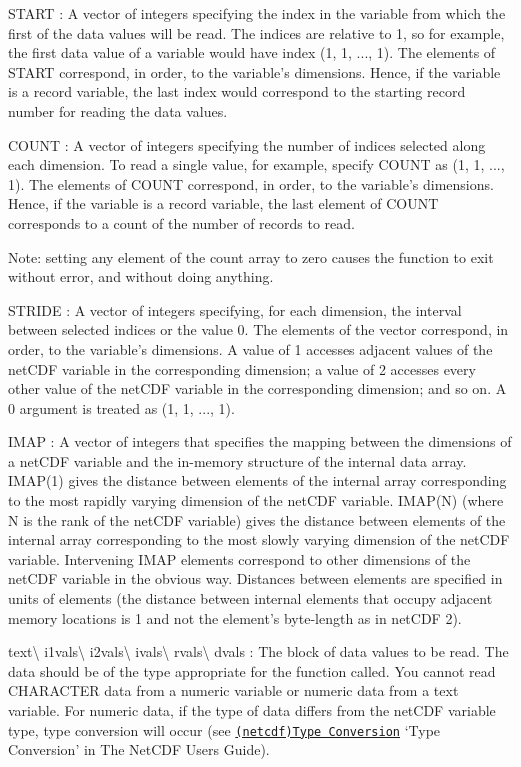 {\ttfamily S\+T\+A\+RT} \+: A vector of integers specifying the index in the variable from which the first of the data values will be read. The indices are relative to 1, so for example, the first data value of a variable would have index (1, 1, ..., 1). The elements of S\+T\+A\+RT correspond, in order, to the variable’s dimensions. Hence, if the variable is a record variable, the last index would correspond to the starting record number for reading the data values.

{\ttfamily C\+O\+U\+NT} \+: A vector of integers specifying the number of indices selected along each dimension. To read a single value, for example, specify C\+O\+U\+NT as (1, 1, ..., 1). The elements of C\+O\+U\+NT correspond, in order, to the variable’s dimensions. Hence, if the variable is a record variable, the last element of C\+O\+U\+NT corresponds to a count of the number of records to read.

Note\+: setting any element of the count array to zero causes the function to exit without error, and without doing anything.

{\ttfamily S\+T\+R\+I\+DE} \+: A vector of integers specifying, for each dimension, the interval between selected indices or the value 0. The elements of the vector correspond, in order, to the variable’s dimensions. A value of 1 accesses adjacent values of the net\+C\+DF variable in the corresponding dimension; a value of 2 accesses every other value of the net\+C\+DF variable in the corresponding dimension; and so on. A 0 argument is treated as (1, 1, ..., 1).

{\ttfamily I\+M\+AP} \+: A vector of integers that specifies the mapping between the dimensions of a net\+C\+DF variable and the in-\/memory structure of the internal data array. I\+M\+A\+P(1) gives the distance between elements of the internal array corresponding to the most rapidly varying dimension of the net\+C\+DF variable. I\+M\+A\+P(\+N) (where N is the rank of the net\+C\+DF variable) gives the distance between elements of the internal array corresponding to the most slowly varying dimension of the net\+C\+DF variable. Intervening I\+M\+AP elements correspond to other dimensions of the net\+C\+DF variable in the obvious way. Distances between elements are specified in units of elements (the distance between internal elements that occupy adjacent memory locations is 1 and not the element’s byte-\/length as in net\+C\+DF 2).

{\ttfamily text}\textbackslash{} {\ttfamily i1vals}\textbackslash{} {\ttfamily i2vals}\textbackslash{} {\ttfamily ivals}\textbackslash{} {\ttfamily rvals}\textbackslash{} {\ttfamily dvals} \+: The block of data values to be read. The data should be of the type appropriate for the function called. You cannot read C\+H\+A\+R\+A\+C\+T\+ER data from a numeric variable or numeric data from a text variable. For numeric data, if the type of data differs from the net\+C\+DF variable type, type conversion will occur (see \href{netcdf.html#Type-Conversion}{\tt (netcdf)Type Conversion} ‘\+Type Conversion’ in The Net\+C\+DF Users Guide).

